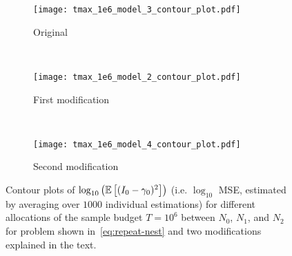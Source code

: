 \begin{figure}[t]
	\centering
	\begin{subfigure}[b]{0.32\textwidth}
		\centering
		\texttt{[image: tmax\_1e6\_model\_3\_contour\_plot.pdf]}
		\caption{Original}
	\end{subfigure}
	~\hspace{4pt}
	\begin{subfigure}[b]{0.32\textwidth}
		\centering
		\texttt{[image: tmax\_1e6\_model\_2\_contour\_plot.pdf]}
		\caption{First modification}
	\end{subfigure}
	~\hspace{-3pt}
	\begin{subfigure}[b]{0.32\textwidth}
		\centering
		\texttt{[image: tmax\_1e6\_model\_4\_contour\_plot.pdf]}
		\caption{Second modification}
	\end{subfigure}
	\caption{Contour plots of $\log_{10} \left(\mathbb{E} \left[(I_0-\gamma_0)^2\right]\right)$ (i.e. $\log_{10}$ MSE, estimated
		by averaging over $1000$ individual estimations)
		for different allocations of the sample budget $T=10^6$ between $N_0$, $N_1$,
		and $N_2$ for problem shown in~\eqref{eq:repeat-nest} and two modifications explained in
		the text.
		\label{fig:multi-tau}}
\end{figure}	